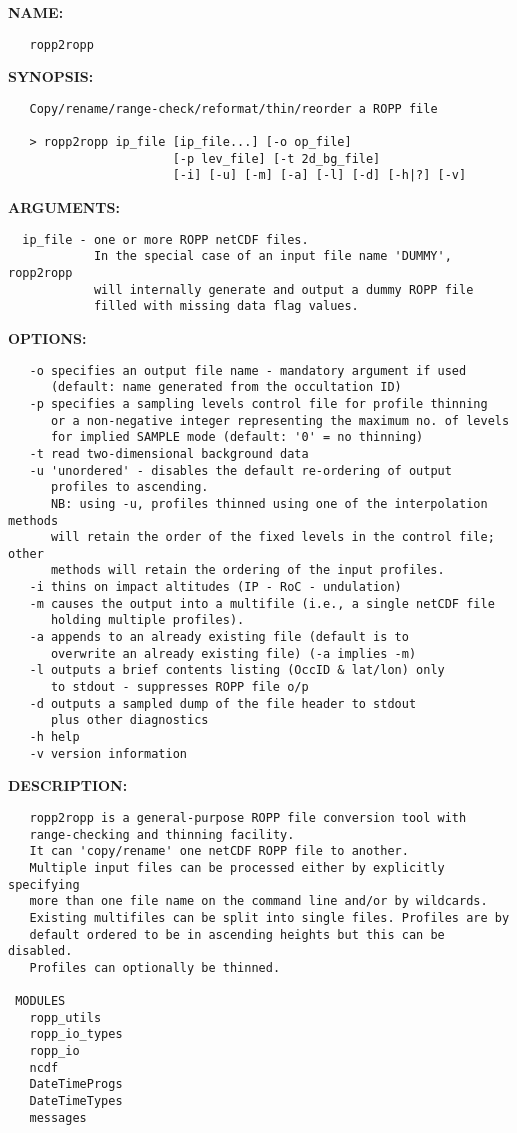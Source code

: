\label{ch:robo88}
\label{ch:Programs_ropp2ropp}
\textbf{NAME:}\hspace{0.08in}\begin{Verbatim}
   ropp2ropp
\end{Verbatim}
\textbf{SYNOPSIS:}\hspace{0.08in}\begin{Verbatim}
   Copy/rename/range-check/reformat/thin/reorder a ROPP file

   > ropp2ropp ip_file [ip_file...] [-o op_file]
                       [-p lev_file] [-t 2d_bg_file]
                       [-i] [-u] [-m] [-a] [-l] [-d] [-h|?] [-v]
\end{Verbatim}
\textbf{ARGUMENTS:}\hspace{0.08in}\begin{Verbatim}
  ip_file - one or more ROPP netCDF files.
            In the special case of an input file name 'DUMMY', ropp2ropp
            will internally generate and output a dummy ROPP file
            filled with missing data flag values.
\end{Verbatim}
\textbf{OPTIONS:}\hspace{0.08in}\begin{Verbatim}
   -o specifies an output file name - mandatory argument if used
      (default: name generated from the occultation ID)
   -p specifies a sampling levels control file for profile thinning
      or a non-negative integer representing the maximum no. of levels
      for implied SAMPLE mode (default: '0' = no thinning)
   -t read two-dimensional background data
   -u 'unordered' - disables the default re-ordering of output
      profiles to ascending.
      NB: using -u, profiles thinned using one of the interpolation methods
      will retain the order of the fixed levels in the control file; other
      methods will retain the ordering of the input profiles.
   -i thins on impact altitudes (IP - RoC - undulation)
   -m causes the output into a multifile (i.e., a single netCDF file
      holding multiple profiles).
   -a appends to an already existing file (default is to
      overwrite an already existing file) (-a implies -m)
   -l outputs a brief contents listing (OccID & lat/lon) only
      to stdout - suppresses ROPP file o/p
   -d outputs a sampled dump of the file header to stdout
      plus other diagnostics
   -h help
   -v version information
\end{Verbatim}
\textbf{DESCRIPTION:}\hspace{0.08in}\begin{Verbatim}
   ropp2ropp is a general-purpose ROPP file conversion tool with
   range-checking and thinning facility.
   It can 'copy/rename' one netCDF ROPP file to another.
   Multiple input files can be processed either by explicitly specifying
   more than one file name on the command line and/or by wildcards.
   Existing multifiles can be split into single files. Profiles are by
   default ordered to be in ascending heights but this can be disabled.
   Profiles can optionally be thinned.

 MODULES
   ropp_utils
   ropp_io_types
   ropp_io
   ncdf
   DateTimeProgs
   DateTimeTypes
   messages
\end{Verbatim}

